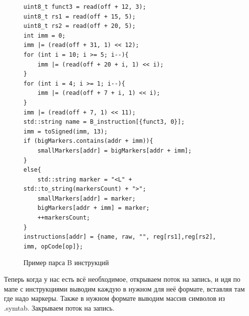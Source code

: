 \documentclass{article}
\begin{document}
\begin{figure}[H]
	\begin{lstlisting}
uint8_t funct3 = read(off + 12, 3);
uint8_t rs1 = read(off + 15, 5);
uint8_t rs2 = read(off + 20, 5);
int imm = 0;
imm |= (read(off + 31, 1) << 12);
for (int i = 10; i >= 5; i--){
	imm |= (read(off + 20 + i, 1) << i);
}
for (int i = 4; i >= 1; i--){
	imm |= (read(off + 7 + i, 1) << i);
}
imm |= (read(off + 7, 1) << 11);
std::string name = B_instruction[{funct3, 0}];
imm = toSigned(imm, 13);
if (bigMarkers.contains(addr + imm)){
	smallMarkers[addr] = bigMarkers[addr + imm];
}
else{
	std::string marker = "<L" + std::to_string(markersCount) + ">";
	smallMarkers[addr] = marker;
	bigMarkers[addr + imm] = marker;
	++markersCount;
}
instructions[addr] = {name, raw, "", reg[rs1],reg[rs2], imm, opCode[op]};
	\end{lstlisting}
	\caption{Пример парса B инструкций}
\end{figure}
Теперь когда у нас есть всё необходимое, открываем поток на запись, и идя по мапе с инструкциями выводим каждую в нужном для неё формате, вставляя там где надо маркеры. Также в нужном формате выводим массив символов из .symtab. Закрываем поток на запись.
\end{document}
